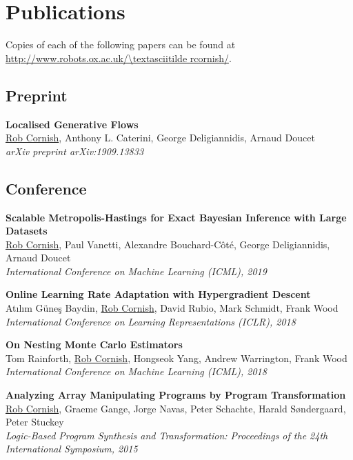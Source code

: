 \documentclass[12pt,a4paper]{article}
\begin{document}
\section*{Publications}

Copies of each of the following papers can be found at \\
\url{http://www.robots.ox.ac.uk/\textasciitilde rcornish/}.

\subsection*{Preprint}

\textbf{Localised Generative Flows} \\
\underline{Rob Cornish}, Anthony L. Caterini, George Deligiannidis, Arnaud Doucet \\
\textit{arXiv preprint arXiv:1909.13833}

\subsection*{Conference}

\textbf{Scalable Metropolis-Hastings for Exact Bayesian Inference with Large Datasets} \\
\underline{Rob Cornish}, Paul Vanetti, Alexandre Bouchard-C\^ot\'e, George Deligiannidis, Arnaud Doucet \\
\textit{International Conference on Machine Learning (ICML), 2019}

\noindent
\textbf{Online Learning Rate Adaptation with Hypergradient Descent} \\
At\i l\i m G\"une\c s Baydin, \underline{Rob Cornish}, David Rubio, Mark Schmidt, Frank Wood \\
\textit{International Conference on Learning Representations (ICLR), 2018}

\noindent
\textbf{On Nesting Monte Carlo Estimators} \\
Tom Rainforth, \underline{Rob Cornish}, Hongseok Yang, Andrew Warrington, Frank Wood \\
\textit{International Conference on Machine Learning (ICML), 2018}

\noindent
\textbf{Analyzing Array Manipulating Programs by Program Transformation} \\
\underline{Rob Cornish}, Graeme Gange, Jorge Navas, Peter Schachte, Harald S\o ndergaard, Peter Stuckey \\
\textit{Logic-Based Program Synthesis and Transformation: Proceedings of the 24th International Symposium, 2015}
\end{document}
